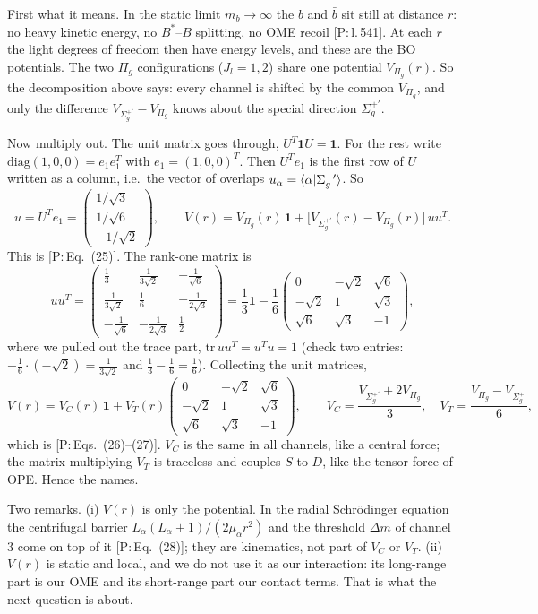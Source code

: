 \documentclass[11pt]{article}
\newcommand{\tagP}[1]{\textcolor{blue!65!black}{\textsf{\small[P:\,#1]}}}
\newenvironment{aiadd}{\par}{\par}
\begin{document}
\begin{aiadd}
	First what it means. In the static limit $m_b\to\infty$ the $b$ and $\bar b$ sit still at distance $r$: no heavy kinetic energy, no $B^*$--$B$ splitting, no OME recoil \tagP{l.\,541}. At each $r$ the light degrees of freedom then have energy levels, and these are the BO potentials. The two $\Pi_g$ configurations ($J_l=1,2$) share one potential $V_{\Pi_g}(r)$. So the decomposition above says: every channel is shifted by the common $V_{\Pi_g}$, and only the difference $V_{\Sigma_g^{+\prime}}-V_{\Pi_g}$ knows about the special direction $\Sigma_g^{+\prime}$.

	Now multiply out. The unit matrix goes through, $U^T\bm 1U=\bm 1$. For the rest write $\text{diag}(1,0,0)=e_1e_1^T$ with $e_1=(1,0,0)^T$. Then $U^Te_1$ is the first row of $U$ written as a column, i.e.\ the vector of overlaps $u_\alpha=\braket{\alpha|\Sigma_g^{+\prime}}$. So
	\[
		u=U^Te_1=\begin{pmatrix}1/\sqrt3\\ 1/\sqrt6\\ -1/\sqrt2\end{pmatrix},\qquad
		V(r)=V_{\Pi_g}(r)\,\bm 1+\big[V_{\Sigma_g^{+\prime}}(r)-V_{\Pi_g}(r)\big]\,uu^T .
	\]
	This is \tagP{Eq.~(25)}. The rank-one matrix is
	\[
		uu^T=\begin{pmatrix}
			\frac13           & \frac{1}{3\sqrt2}  & -\frac{1}{\sqrt6}  \\[1mm]
			\frac{1}{3\sqrt2} & \frac16            & -\frac{1}{2\sqrt3} \\[1mm]
			-\frac{1}{\sqrt6} & -\frac{1}{2\sqrt3} & \frac12
		\end{pmatrix}
		=\frac13\bm 1-\frac16\begin{pmatrix}0&-\sqrt2&\sqrt6\\ -\sqrt2&1&\sqrt3\\ \sqrt6&\sqrt3&-1\end{pmatrix},
	\]
	where we pulled out the trace part, $\text{tr}\,uu^T=u^Tu=1$ (check two entries: $-\frac16\cdot(-\sqrt2)=\frac{1}{3\sqrt2}$ and $\frac13-\frac16=\frac16$). Collecting the unit matrices,
	\[
		V(r)=V_C(r)\,\bm 1+V_T(r)\begin{pmatrix}0&-\sqrt2&\sqrt6\\ -\sqrt2&1&\sqrt3\\ \sqrt6&\sqrt3&-1\end{pmatrix},\qquad
		V_C=\frac{V_{\Sigma_g^{+\prime}}+2V_{\Pi_g}}{3},\quad V_T=\frac{V_{\Pi_g}-V_{\Sigma_g^{+\prime}}}{6},
	\]
	which is \tagP{Eqs.~(26)--(27)}. $V_C$ is the same in all channels, like a central force; the matrix multiplying $V_T$ is traceless and couples $S$ to $D$, like the tensor force of OPE. Hence the names.

	Two remarks. (i) $V(r)$ is only the potential. In the radial Schr\"odinger equation the centrifugal barrier $L_\alpha(L_\alpha+1)/(2\mu_\alpha r^2)$ and the threshold $\Delta m$ of channel 3 come on top of it \tagP{Eq.~(28)}; they are kinematics, not part of $V_C$ or $V_T$. (ii) $V(r)$ is static and local, and we do not use it as our interaction: its long-range part is our OME and its short-range part our contact terms. That is what the next question is about.
\end{aiadd}
\end{document}
